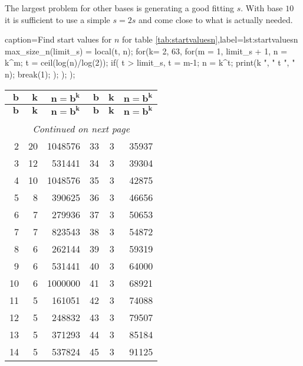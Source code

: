 \documentclass[a4paper,10pt]{article}
\theoremstyle{plain} %
\theoremstyle{definition}
\theoremstyle{remark}
\begin{document}
The largest problem for other bases is generating a good fitting $s$. With base $10$ it is sufficient to use a simple $s = 2s$ and come close to what is actually needed.
\lstset{language=parigp}
\begin{pblisting}{caption={Find start values for $n$ for table \ref{tab:startvaluesn}},label=lst:startvaluesn}
max_size_n(limit_s) = {
   local(t, n);
   for(k= 2, 63,
      for(m = 1, limit_s + 1,
         n = k^m; t = ceil(log(n)/log(2));
         if( t > limit_s,
            t = m-1; n = k^t;
            print(k ", " t ", " n);
            break(1);
         );
      );
   );
}

\end{pblisting}
\begin{center}
\begin{longtable}{r r r | r r r}
\multicolumn{1}{r}{$\mathbf{b}$}&
\multicolumn{1}{r}{$\mathbf{k}$}&
\multicolumn{1}{r}{$\mathbf{n = b^k}$}&
\multicolumn{1}{r}{$\mathbf{b}$}&
\multicolumn{1}{r}{$\mathbf{k}$}&
\multicolumn{1}{r}{$\mathbf{n = b^k}$} \\
\endfirsthead
%
\multicolumn{1}{r}{$\mathbf{b}$}&
\multicolumn{1}{r}{$\mathbf{k}$}&
\multicolumn{1}{r}{$\mathbf{n = b^k}$}&
\multicolumn{1}{r}{$\mathbf{b}$}&
\multicolumn{1}{r}{$\mathbf{k}$}&
\multicolumn{1}{r}{$\mathbf{n = b^k}$} \\
\endhead
\rule{0pt}{1ex}\\
\multicolumn{6}{c}{{\footnotesize{\textit{Continued on next page}}}} \\
\endfoot
\endlastfoot
2 & 20 & 1048576  &  33 & 3 & 35937 \\
3 & 12 & 531441  &   34 & 3 & 39304 \\
4 & 10 & 1048576  &  35 & 3 & 42875 \\
5 & 8 & 390625  &    36 & 3 & 46656 \\
6 & 7 & 279936  &    37 & 3 & 50653 \\
7 & 7 & 823543  &    38 & 3 & 54872 \\
8 & 6 & 262144  &    39 & 3 & 59319 \\
9 & 6 & 531441  &    40 & 3 & 64000 \\
10 & 6 & 1000000  &  41 & 3 & 68921 \\
11 & 5 & 161051  &   42 & 3 & 74088 \\
12 & 5 & 248832  &   43 & 3 & 79507 \\
13 & 5 & 371293  &   44 & 3 & 85184 \\
14 & 5 & 537824  &   45 & 3 & 91125 \\

\end{longtable}
\end{center}
\end{document}

